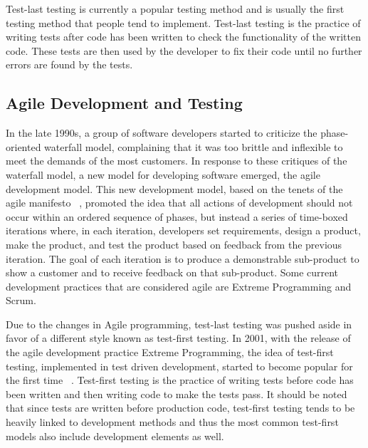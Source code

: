 \documentclass{sig-alternate}
\begin{document}
Test-last testing is currently a popular testing method and is usually the first testing method that people tend to implement.  Test-last testing is the practice of writing tests after code has been written to check the functionality of the written code.  These tests are then used by the developer to fix their code until no further errors are found by the tests.

\subsection{Agile Development and Testing}

In the late 1990s, a group of software developers started to criticize the phase-oriented waterfall model, complaining that it was too brittle and inflexible to meet the demands of the most customers.  In response to these critiques of the waterfall model, a new model for developing software emerged, the agile development model.  This new development model, based on the tenets of the agile manifesto ~\cite{agile:xxx}, promoted the idea that all actions of development should not occur within an ordered sequence of phases, but instead a series of time-boxed iterations where, in each iteration, developers set requirements, design a product, make the product, and test the product based on feedback from the previous iteration.  The goal of each iteration is to produce a demonstrable sub-product to show a customer and to receive feedback on that sub-product.  Some current development practices that are considered agile are Extreme Programming and Scrum.

Due to the changes in Agile programming, test-last testing was pushed aside in favor of a different style known as test-first testing.  In 2001, with the release of the agile development practice Extreme Programming, the idea of test-first testing, implemented in test driven development, started to become popular for the first time ~\cite{Hammond:2012}. Test-first testing is the practice of writing tests before code has been written and then writing code to make the tests pass.  It should be noted that since tests are written before production code, test-first testing tends to be heavily linked to development methods and thus the most common test-first models also include development elements as well. 
\end{document}
